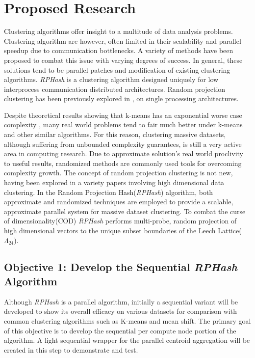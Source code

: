 \documentclass[a4paper,10pt]{article}
\begin{document}
\section{Proposed Research} Clustering algorithms offer insight to a multitude
of data analysis problems.  Clustering algorithm are however, often limited
in their scalability and parallel speedup due to communication bottlenecks.
 A variety of methods have been  proposed to combat this issue with varying
degrees of success.  In general, these solutions tend to be parallel patches
and modification of existing clustering algorithms.  \emph{RPHash} is a
clustering algorithm designed uniquely for low interprocess communication
distributed architectures.  Random projection clustering has been previously
explored in \cite{Urruty2007,florescu09,fernrandom,avogadri09}, on single
processing architectures.

Despite theoretical results showing that k-means has an exponential worse
case complexity \cite{Vattani}, many real world problems tend to fair much
better under k-means and other similar algorithms.  For this reason, clustering
massive datasets, although suffering from unbounded complexity guarantees, is
still a very active area in computing research.  Due to approximate solution's
real world proclivity to useful results, randomized methods are commonly
used tools for overcoming complexity growth. The concept of random projection
clustering is not new, having been explored in a variety papers involving
high dimensional data clustering\cite{Proclus}.
In the Random Projection
Hash(\emph{RPHash}) algorithm, both approximate and randomized techniques
are employed to provide a scalable, approximate parallel system for massive
dataset clustering.  To combat the curse of dimensionality(COD) \emph{RPHash}
performs multi-probe, random projection of high dimensional vectors to the
unique subset boundaries of the Leech Lattice($\Lambda_{24}$)\cite{Andoni}.

\subsection{Objective 1: Develop the  Sequential \emph{RPHash} Algorithm}
Although \emph{RPHash} is a parallel algorithm, initially a sequential variant 
will be developed to show its overall efficacy on various datasets for 
comparison with common clustering
algorithms such as K-means and mean shift.  The primary goal of this objective
is to develop the sequential per compute node portion of the algorithm.
A light sequential wrapper for the parallel centroid aggregation will be
created in this step to demonstrate and test.
\end{document}
